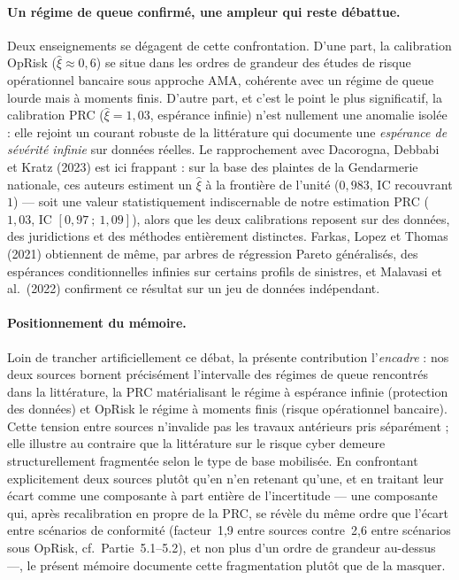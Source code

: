 \documentclass[11pt,a4paper]{article}
\theoremstyle{navystyle}
\theoremstyle{navydef}
\begin{document}
\paragraph{Un régime de queue confirmé, une ampleur qui reste débattue.}
Deux enseignements se dégagent de cette confrontation. D'une part, la
calibration OpRisk ($\hat\xi \approx 0{,}6$) se situe dans les ordres de
grandeur des études de risque opérationnel bancaire sous approche AMA,
cohérente avec un régime de queue lourde mais à moments finis. D'autre part,
et c'est le point le plus significatif, la calibration PRC ($\hat\xi = 1{,}03$,
espérance infinie) n'est nullement une anomalie isolée : elle rejoint un
courant robuste de la littérature qui documente une \emph{espérance de
sévérité infinie} sur données réelles. Le rapprochement avec Dacorogna,
Debbabi et Kratz (2023) est ici frappant : sur la base des plaintes de la
Gendarmerie nationale, ces auteurs estiment un $\hat\xi$ à la frontière de
l'unité ($0{,}983$, IC recouvrant $1$) --- soit une valeur statistiquement
indiscernable de notre estimation PRC ($1{,}03$, IC $[0{,}97~;~1{,}09]$),
alors que les deux calibrations reposent sur des données, des juridictions et
des méthodes entièrement distinctes. Farkas, Lopez et Thomas (2021)
obtiennent de même, par arbres de régression Pareto généralisés, des
espérances conditionnelles infinies sur certains profils de sinistres, et
Malavasi et al.\ (2022) confirment ce résultat sur un jeu de données
indépendant.

\paragraph{Positionnement du mémoire.} Loin de trancher artificiellement ce
débat, la présente contribution l'\emph{encadre} : nos deux sources bornent
précisément l'intervalle des régimes de queue rencontrés dans la littérature,
la PRC matérialisant le régime à espérance infinie (protection des données)
et OpRisk le régime à moments finis (risque opérationnel bancaire). Cette
tension entre sources n'invalide pas les travaux antérieurs pris séparément ;
elle illustre au contraire que la littérature sur le risque cyber demeure
structurellement fragmentée selon le type de base mobilisée. En confrontant
explicitement deux sources plutôt qu'en n'en retenant qu'une, et en traitant
leur écart comme une composante à part entière de l'incertitude --- une
composante qui, après recalibration en propre de la PRC, se révèle du même
ordre que l'écart entre scénarios de conformité (facteur~1{,}9 entre sources
contre~2{,}6 entre scénarios sous OpRisk, cf.~Partie~5.1--5.2), et non plus
d'un ordre de grandeur au-dessus ---, le présent mémoire documente cette
fragmentation plutôt que de la masquer.
\end{document}
